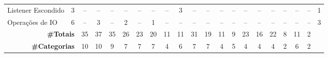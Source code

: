\begin{table*}[t]
\begin{tabular}{@{}p{3.8cm}p{0.3cm}p{.2cm}p{.2cm}p{.2cm}p{.2cm}p{.2cm}p{.2cm}p{.2cm}p{.2cm}p{.2cm}p{.4cm}p{.4cm}p{.4cm}p{.4cm}p{.4cm}p{.4cm}p{.4cm}p{.4cm}p{.4cm}p{0.2cm}@{}}
Listener Escondido							& \multicolumn{1}{c}{3} 	& \multicolumn{1}{c}{--} 	& \multicolumn{1}{c}{--} 	& \multicolumn{1}{c}{--} 	& \multicolumn{1}{c}{--} 	& \multicolumn{1}{c}{--} 	& \multicolumn{1}{c}{--} 	& \multicolumn{1}{c}{--} 	& \multicolumn{1}{c}{3} 	& \multicolumn{1}{c}{--} 	& \multicolumn{1}{c}{--} 	& \multicolumn{1}{c}{--} 	& \multicolumn{1}{c}{--} 	& \multicolumn{1}{c}{--} 	& \multicolumn{1}{c}{--} 	& \multicolumn{1}{c}{--} 	& \multicolumn{1}{c}{--} 	& \multicolumn{1}{c}{--} 	& \multicolumn{1}{c}{--} 	& \multicolumn{1}{c}{1} \\
Opera\c{c}\~oes de IO							& \multicolumn{1}{c}{6} 	& \multicolumn{1}{c}{--} 	& \multicolumn{1}{c}{3} 	& \multicolumn{1}{c}{--} 	& \multicolumn{1}{c}{2} 	& \multicolumn{1}{c}{--} 	& \multicolumn{1}{c}{1} 	& \multicolumn{1}{c}{--} 	& \multicolumn{1}{c}{--} 	& \multicolumn{1}{c}{--} 	& \multicolumn{1}{c}{--} 	& \multicolumn{1}{c}{--} 	& \multicolumn{1}{c}{--} 	& \multicolumn{1}{c}{--} 	& \multicolumn{1}{c}{--} 	& \multicolumn{1}{c}{--} 	& \multicolumn{1}{c}{--} 	& \multicolumn{1}{c}{--} 	& \multicolumn{1}{c}{--} 	& \multicolumn{1}{c}{3} \\
\hline
\multicolumn{2}{r}{\textbf{\#Totais}}		& \multicolumn{1}{c}{35} 	& \multicolumn{1}{c}{37} 	& \multicolumn{1}{c}{35} 	& \multicolumn{1}{c}{26} 	& \multicolumn{1}{c}{23} 	& \multicolumn{1}{c}{20} 	& \multicolumn{1}{c}{11} 	& \multicolumn{1}{c}{11} 	& \multicolumn{1}{c}{31} 	& \multicolumn{1}{c}{19} 	& \multicolumn{1}{c}{11} 	& \multicolumn{1}{c}{9} 	& \multicolumn{1}{c}{23} 	& \multicolumn{1}{c}{16} 	& \multicolumn{1}{c}{22} 	& \multicolumn{1}{c}{8} 	& \multicolumn{1}{c}{11} 	& \multicolumn{1}{c}{2} \\
\hline
\multicolumn{2}{r}{\textbf{\#Categorias}}	& \multicolumn{1}{c}{10} 	& \multicolumn{1}{c}{10} 	& \multicolumn{1}{c}{9} 	& \multicolumn{1}{c}{7} 	& \multicolumn{1}{c}{7} 	& \multicolumn{1}{c}{7} 	& \multicolumn{1}{c}{4} 	& \multicolumn{1}{c}{6} 	& \multicolumn{1}{c}{7} 	& \multicolumn{1}{c}{7} 	& \multicolumn{1}{c}{4} 	& \multicolumn{1}{c}{5} 	& \multicolumn{1}{c}{4} 	& \multicolumn{1}{c}{4} 	& \multicolumn{1}{c}{4} 	& \multicolumn{1}{c}{2} 	& \multicolumn{1}{c}{6} 	& \multicolumn{1}{c}{2} \\
\hline


\end{tabular}
\end{table*}
